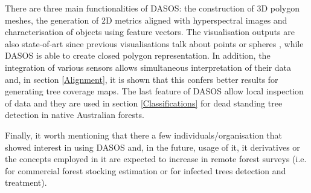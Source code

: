 \documentclass{subfiles}
\begin{document}
	   	\par There are three main functionalities of DASOS: the construction of 3D polygon meshes, the generation of 2D metrics aligned with hyperspectral images and{\color{blue} characterisation of objects using feature vectors}. The visualisation outputs are also state-of-art since previous visualisations talk about points \cite{Bunting2013} or spheres \cite{Chauve2009}, while DASOS is able to create closed polygon representation. In addition, the integration of various sensors allows simultaneous interpretation of their data and, in section \ref{Alignment}, it is shown that this confers better results for generating tree coverage maps. The last feature of DASOS allow local inspection of data and they are used in section \ref{Classifications} for dead standing tree detection in native Australian forests.
	   		
	   	\par Finally, it worth mentioning that there a few individuals/organisation that showed interest in using DASOS and, in the future, usage of it, it derivatives or the concepts employed in it are expected to increase in remote forest surveys (i.e. for commercial forest stocking estimation or for infected trees detection and treatment).
	   	
\end{document}
